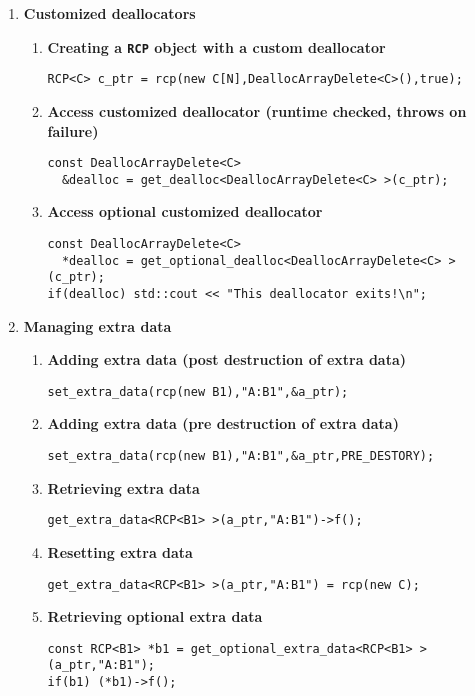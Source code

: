 \documentclass[pdf,ps2pdf,11pt]{SANDreport}
\begin{document}
\begin{enumerate}
\item {\bf Customized deallocators}
\label{rcpqs:apdx:qs:dealloc}
%
\begin{enumerate}
%
\item {\bf Creating a \texttt{RCP} object with a custom deallocator }
%
{\small\begin{verbatim}
RCP<C> c_ptr = rcp(new C[N],DeallocArrayDelete<C>(),true);
\end{verbatim}}
%
\item {\bf Access customized deallocator (runtime checked, throws on failure)}
%
{\small\begin{verbatim}
const DeallocArrayDelete<C>
  &dealloc = get_dealloc<DeallocArrayDelete<C> >(c_ptr);
\end{verbatim}}
%
\item {\bf Access optional customized deallocator}
%
{\small\begin{verbatim}
const DeallocArrayDelete<C>
  *dealloc = get_optional_dealloc<DeallocArrayDelete<C> >(c_ptr);
if(dealloc) std::cout << "This deallocator exits!\n";
\end{verbatim}}
%
\end{enumerate}

\item {\bf Managing extra data}
\label{rcpqs:apdx:qs:extra-data}
%
\begin{enumerate}
%
\item {\bf Adding extra data (post destruction of extra data)}
%
{\small\begin{verbatim}
set_extra_data(rcp(new B1),"A:B1",&a_ptr);
\end{verbatim}}
%
\item {\bf Adding extra data (pre destruction of extra data)}
%
{\small\begin{verbatim}
set_extra_data(rcp(new B1),"A:B1",&a_ptr,PRE_DESTORY);
\end{verbatim}}
%
\item {\bf Retrieving extra data}
%
{\small\begin{verbatim}
get_extra_data<RCP<B1> >(a_ptr,"A:B1")->f();
\end{verbatim}}
%
\item {\bf Resetting extra data}
%
{\small\begin{verbatim}
get_extra_data<RCP<B1> >(a_ptr,"A:B1") = rcp(new C);
\end{verbatim}}
%
\item {\bf Retrieving optional extra data}
%
{\small\begin{verbatim}
const RCP<B1> *b1 = get_optional_extra_data<RCP<B1> >(a_ptr,"A:B1");
if(b1) (*b1)->f();
\end{verbatim}}
%
\end{enumerate}


\end{enumerate}
\end{document}
